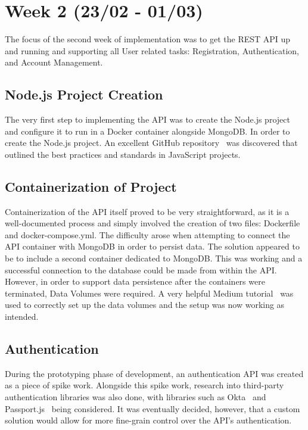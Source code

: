 \newpage

\section{Week 2 (23/02 - 01/03)}
The focus of the second week of implementation was to get the REST API up and running and supporting all User related tasks: Registration, Authentication, and Account Management.

\subsection{Node.js Project Creation}
The very first step to implementing the API was to create the Node.js project and configure it to run in a Docker container alongside MongoDB. In order to create the Node.js project. An excellent GitHub repository~\cite{js_guidelines_documentation_ref} was discovered that outlined the best practices and standards in JavaScript projects.

\subsection{Containerization of Project}
Containerization of the API itself proved to be very straightforward, as it is a well-documented process and simply involved the creation of two files: Dockerfile and docker-compose.yml. The difficulty arose when attempting to connect the API container with MongoDB in order to persist data. The solution appeared to be to include a second container dedicated to MongoDB. This was working and a successful connection to the database could be made from within the API. However, in order to support data persistence after the containers were terminated, Data Volumes were required. A very helpful Medium tutorial~\cite{docker_medium_tutorial_ref} was used to correctly set up the data volumes and the setup was now working as intended.

\subsection{Authentication}
During the prototyping phase of development, an authentication API was created as a piece of spike work. Alongside this spike work, research into third-party authentication libraries was also done, with libraries such as Okta~\cite{okta_documentation_ref} and Passport.js~\cite{passport_documentation_ref} being considered. It was eventually decided, however, that a custom solution would allow for more fine-grain control over the API's authentication.


